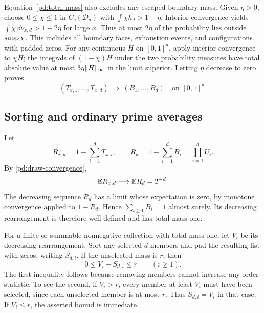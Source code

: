 Equation~\eqref{pd:total-mass} also excludes any escaped boundary
mass.  Given $\eta>0$, choose $0\leq\chi\leq1$ in
$C_c(\mathcal D_d)$ with $\int\chi h_d>1-\eta$.
Interior convergence yields
$\int\chi\,\dd\nu_{x,d}>1-2\eta$ for large $x$.  Thus at most
$2\eta$ of the probability lies outside $\operatorname{supp}\chi$.  This includes
all boundary faces, exhaustion events, and configurations with
padded zeros.  For any continuous $H$ on $[0,1]^d$, apply interior
convergence to $\chi H$; the integrals of $(1-\chi)H$ under the
two probability measures have total absolute value at most
$3\eta\lVert H\rVert_\infty$ in the limit superior.  Letting $\eta$
decrease to zero proves
\begin{equation}\label{pd:draw-convergence}
 (T_{x,1},\ldots,T_{x,d})
 \ \Longrightarrow\ (B_1,\ldots,B_d)
 \quad\text{on }[0,1]^d.
\end{equation}

\subsection{Sorting and ordinary prime averages}

Let
\[
 R_{x,d}=1-\sum_{i=1}^dT_{x,i},\qquad
 R_d=1-\sum_{i=1}^dB_i=\prod_{i=1}^dU_i.
\]
By \eqref{pd:draw-convergence},
\begin{equation}\label{pd:unseen-mass}
 \mathbb E R_{x,d}\longrightarrow\mathbb E R_d=2^{-d}.
\end{equation}
The decreasing sequence $R_d$ has a limit whose expectation is
zero, by monotone convergence applied to $1-R_d$.  Hence
$\sum_{i\geq1}B_i=1$ almost surely.  Its decreasing rearrangement
is therefore well-defined and has total mass one.

For a finite or summable nonnegative collection with total mass one,
let $V_i$ be its decreasing rearrangement.  Sort any selected $d$
members and pad the resulting list with zeros, writing $S_{d,i}$.
If the unselected mass is $r$, then
\begin{equation}\label{pd:sorting-bound}
 0\leq V_i-S_{d,i}\leq r\qquad(i\geq1).
\end{equation}
The first inequality follows because removing members cannot
increase any order statistic.  To see the second, if $V_i>r$,
every member at least $V_i$ must have been selected, since each
unselected member is at most $r$.  Thus $S_{d,i}=V_i$ in that
case.  If $V_i\leq r$, the asserted bound is immediate.

